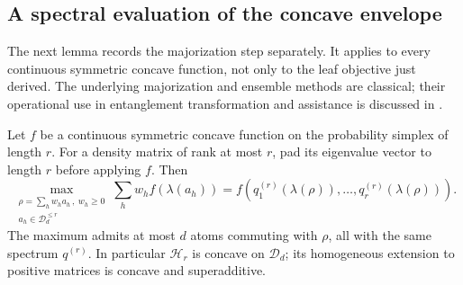 \subsection{A spectral evaluation of the concave envelope}
The next lemma records the majorization step separately.  It applies
to every continuous symmetric concave function, not only to the leaf
objective just derived.  The underlying majorization and ensemble
methods are classical; their operational use in entanglement
transformation and assistance is discussed in
\cite{Nielsen94,JonathanPlenio94,Assistance94}.

\begin{lemma}\label{lem:spectralroof94}
Let $f$ be a continuous symmetric concave function on the probability
simplex of length $r$.  For a density matrix of rank at most $r$, pad
its eigenvalue vector to length $r$ before applying $f$.  Then
\begin{equation}\label{eq:spectralroof94}
 \max_{\substack{\rho=\sum_hw_ha_h\,,\ w_h\ge0\\
                         a_h\in\mathcal D_d^{\le r}}}
        \sum_hw_h f(\lambda(a_h))
        =f(q^{(r)}_1(\lambda(\rho)),\ldots,
                                   q^{(r)}_r(\lambda(\rho))).
\end{equation}
The maximum admits at most $d$ atoms commuting with $\rho$, all with
the same spectrum $q^{(r)}$.  In particular $\mathcal H_r$ is concave
on $\mathcal D_d$; its homogeneous extension to positive matrices is
concave and superadditive.
\end{lemma}
